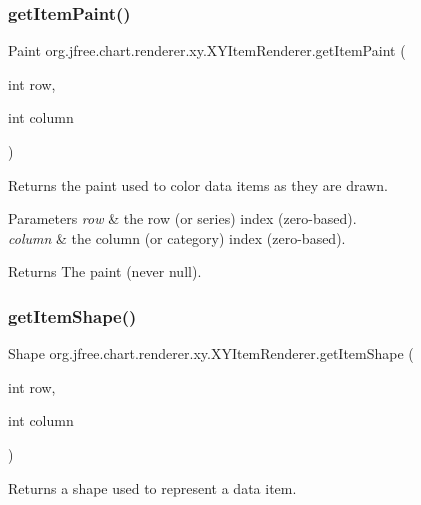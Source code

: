 \subsubsection{\texorpdfstring{get\+Item\+Paint()}{getItemPaint()}}
{\footnotesize\ttfamily Paint org.\+jfree.\+chart.\+renderer.\+xy.\+X\+Y\+Item\+Renderer.\+get\+Item\+Paint (\begin{DoxyParamCaption}\item[{int}]{row,  }\item[{int}]{column }\end{DoxyParamCaption})}

Returns the paint used to color data items as they are drawn.


\begin{DoxyParams}{Parameters}
{\em row} & the row (or series) index (zero-\/based). \\
\hline
{\em column} & the column (or category) index (zero-\/based).\\
\hline
\end{DoxyParams}
\begin{DoxyReturn}{Returns}
The paint (never {\ttfamily null}). 
\end{DoxyReturn}
\mbox{\label{interfaceorg_1_1jfree_1_1chart_1_1renderer_1_1xy_1_1_x_y_item_renderer_a15d5e2b9251050a857a0f1fb57f32863}} 
\subsubsection{\texorpdfstring{get\+Item\+Shape()}{getItemShape()}}
{\footnotesize\ttfamily Shape org.\+jfree.\+chart.\+renderer.\+xy.\+X\+Y\+Item\+Renderer.\+get\+Item\+Shape (\begin{DoxyParamCaption}\item[{int}]{row,  }\item[{int}]{column }\end{DoxyParamCaption})}

Returns a shape used to represent a data item.


